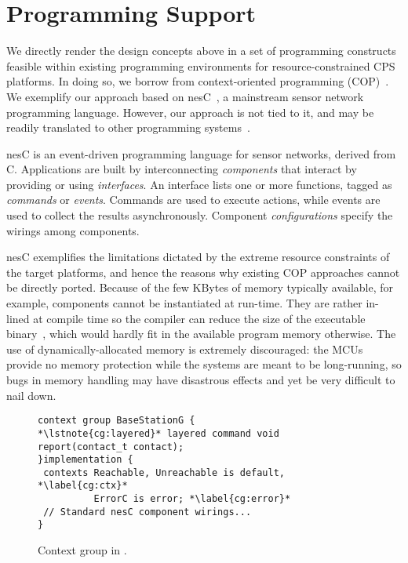 \section{Programming Support}
\label{sec:conesc}

We directly render the design concepts above in a set of programming
constructs feasible within existing programming environments for
resource-constrained CPS platforms. In doing so, we borrow from
context-oriented programming (COP)~\cite{}. We exemplify our approach
based on nesC~\cite{}, a mainstream sensor network programming
language. However, our approach is not tied to it, and may be readily
translated to other programming systems~\cite{programmingsurvey}.

 nesC is an event-driven programming language
for sensor networks, derived from C. Applications are built by
interconnecting \emph{components} that interact by providing or using
\emph{interfaces}. An interface lists one or more functions, tagged as
\emph{commands} or \emph{events}. Commands are used to execute
actions, while events are used to collect the results
asynchronously. %
Component \emph{configurations} specify the wirings among
components. %

nesC exemplifies the limitations dictated by the extreme resource
constraints of the target platforms, and hence the reasons why
existing COP approaches cannot be directly ported. Because of the few
KBytes of memory typically available, for example, components cannot
be instantiated at run-time. They are rather in-lined at compile time
so the compiler can reduce the size of the executable
binary~\cite{nesc}, which would hardly fit in the available program
memory otherwise. The use of dynamically-allocated memory is extremely
discouraged: the MCUs provide no memory protection while the systems
are meant to be long-running, so bugs in memory handling may have
disastrous effects and yet be very difficult to nail down.


\begin{figure}[!tb]
\begin{lstlisting}[style=conescframe]
context group BaseStationG {
*\lstnote{cg:layered}* layered command void report(contact_t contact);
}implementation {
 contexts Reachable, Unreachable is default, *\label{cg:ctx}* 
          ErrorC is error; *\label{cg:error}*
 // Standard nesC component wirings...
}
\end{lstlisting}
\vspace{-4mm}
\caption{Context group in \conesc.}
  \label{fig:configuration}
\vspace{-2mm}
\end{figure}


